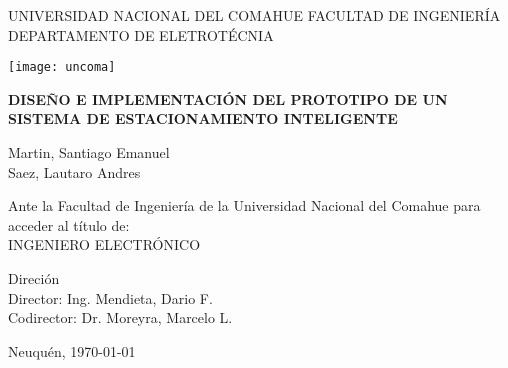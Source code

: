 \begin{titlepage}
    \begin{center}
        UNIVERSIDAD NACIONAL DEL COMAHUE
        FACULTAD DE INGENIERÍA
        DEPARTAMENTO DE ELETROTÉCNIA

        \vspace*{1cm}
        \texttt{[image: uncoma]}
        \vspace*{1cm}

        \begin{large}
            \uppercase{\textbf{Diseño e implementación del prototipo de un sistema de estacionamiento inteligente}}
        \end{large}

        \vspace*{1.5cm}

        Martin, Santiago Emanuel \\
        Saez, Lautaro Andres

        \vspace*{1cm}

        Ante la Facultad de Ingeniería de la Universidad Nacional del Comahue para
        acceder al título de:\\
        INGENIERO ELECTRÓNICO

        \vspace*{0.8cm}

        Direción\\
        Director: Ing. Mendieta, Dario F. \\
        Codirector: Dr. Moreyra, Marcelo L.

        \vspace*{1cm}
        Neuquén, \today


    \end{center}
\end{titlepage}